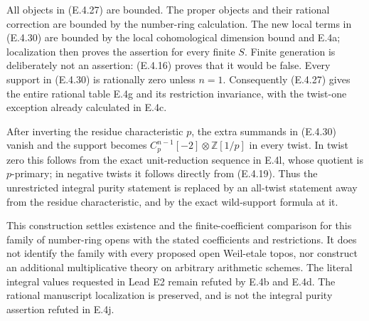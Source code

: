 All objects in (E.4.27) are bounded. The proper objects and
their rational correction are bounded by the number-ring
calculation. The new local terms in (E.4.30) are bounded by
the local cohomological dimension bound and E.4a; localization
then proves the assertion for every finite $S$.
Finite generation is deliberately not an assertion:
(E.4.16) proves that it would be false.
Every support in (E.4.30) is rationally zero unless $n=1$.
Consequently (E.4.27) gives the entire rational table E.4g
and its restriction invariance, with the twist-one exception
already calculated in E.4c.

After inverting the residue characteristic $p$, the extra
summands in (E.4.30) vanish and the support becomes
$C_p^{n-1}[-2]\otimes\mathbb Z[1/p]$ in every twist.
In twist zero this follows from the exact unit-reduction
sequence in E.4l, whose quotient is $p$-primary; in negative
twists it follows directly from (E.4.19).
Thus the unrestricted integral purity statement is replaced
by an all-twist statement away from the residue
characteristic, and by the exact wild-support formula at it.

This construction settles existence and the finite-coefficient
comparison for this family of number-ring opens with the
stated coefficients and restrictions. It does not identify
the family with every proposed open Weil-etale topos, nor
construct an additional multiplicative theory on arbitrary
arithmetic schemes. The literal integral values requested in
Lead E2 remain refuted by E.4b and E.4d. The rational
manuscript localization is preserved, and is not the
integral purity assertion refuted in E.4j.
